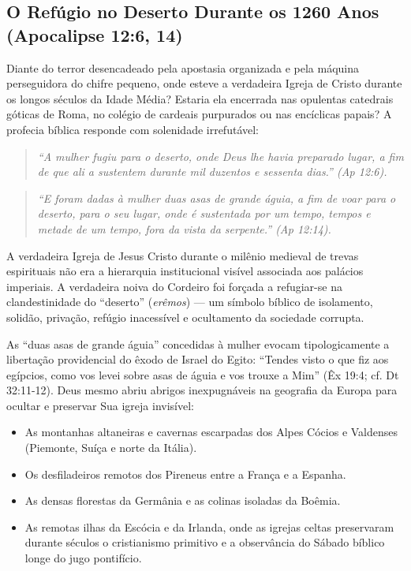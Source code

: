 \documentclass[11pt,a4paper,openany]{book}
\begin{document}
\subsection{O Refúgio no Deserto Durante os 1260 Anos (Apocalipse 12:6, 14)}


Diante do terror desencadeado pela apostasia organizada e pela máquina perseguidora do chifre pequeno, onde esteve a verdadeira Igreja de Cristo durante os longos séculos da Idade Média? Estaria ela encerrada nas opulentas catedrais góticas de Roma, no colégio de cardeais purpurados ou nas encíclicas papais? A profecia bíblica responde com solenidade irrefutável:


\begin{quote}
\itshape ``A mulher fugiu para o deserto, onde Deus lhe havia preparado lugar, a fim de que ali a sustentem durante mil duzentos e sessenta dias.'' (Ap 12:6).
\end{quote}


\begin{quote}
\itshape ``E foram dadas à mulher duas asas de grande águia, a fim de voar para o deserto, para o seu lugar, onde é sustentada por um tempo, tempos e metade de um tempo, fora da vista da serpente.'' (Ap 12:14).
\end{quote}


A verdadeira Igreja de Jesus Cristo durante o milênio medieval de trevas espirituais não era a hierarquia institucional visível associada aos palácios imperiais. A verdadeira noiva do Cordeiro foi forçada a refugiar-se na clandestinidade do ``deserto'' (\textit{erêmos}) — um símbolo bíblico de isolamento, solidão, privação, refúgio inacessível e ocultamento da sociedade corrupta.

As ``duas asas de grande águia'' concedidas à mulher evocam tipologicamente a libertação providencial do êxodo de Israel do Egito: ``Tendes visto o que fiz aos egípcios, como vos levei sobre asas de águia e vos trouxe a Mim'' (Êx 19:4; cf. Dt 32:11-12). Deus mesmo abriu abrigos inexpugnáveis na geografia da Europa para ocultar e preservar Sua igreja invisível:
\begin{itemize}
  \item As montanhas altaneiras e cavernas escarpadas dos Alpes Cócios e Valdenses (Piemonte, Suíça e norte da Itália).
  \item Os desfiladeiros remotos dos Pireneus entre a França e a Espanha.
  \item As densas florestas da Germânia e as colinas isoladas da Boêmia.
  \item As remotas ilhas da Escócia e da Irlanda, onde as igrejas celtas preservaram durante séculos o cristianismo primitivo e a observância do Sábado bíblico longe do jugo pontifício.
\end{itemize}
\end{document}
